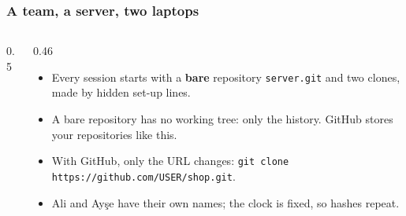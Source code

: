 \documentclass[aspectratio=169,10pt,compress]{beamer}
\begin{document}
\begin{frame}[t,fragile] \frametitle{A team, a server, two laptops}
  \begin{columns}[T]
    \begin{column}{0.5\textwidth}
      \begin{center}
      \end{center}
    \end{column}
    \begin{column}{0.46\textwidth}
      \begin{itemize}\small
        \item Every session starts with a \textbf{bare} repository \texttt{server.git} and two clones, made by hidden set-up lines.
        \item A bare repository has no working tree: only the history. GitHub stores your repositories like this.
        \item With GitHub, only the URL changes: \texttt{git clone https://github.com/USER/shop.git}.
        \item Ali and Ayşe have their own names; the clock is fixed, so hashes repeat.
      \end{itemize}
    \end{column}
  \end{columns}
\end{frame}

\end{document}
